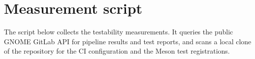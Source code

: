 
\section{Measurement script}
\label{app:script}

The script below collects the testability measurements. It queries the public GNOME GitLab API for pipeline results and test reports, and scans a local clone of the repository for the CI configuration and the Meson test registrations.


